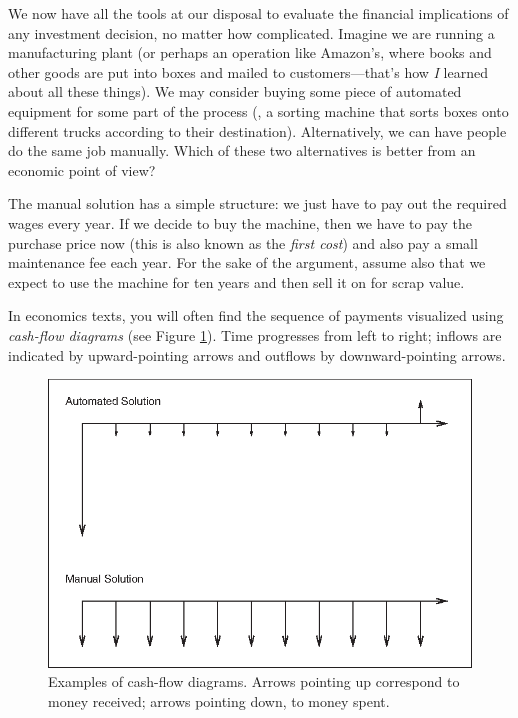 We now have all the tools at our disposal to evaluate the financial
implications of any investment decision, no matter how complicated.
Imagine we are running a manufacturing plant (or perhaps an operation
like Amazon's, where books and other goods are put into boxes and
mailed to customers---that's how \emph{I} learned about all these
things). We may consider buying some piece of automated equipment for
some part of the process (\eg, a sorting machine that sorts boxes onto
different trucks according to their destination).  Alternatively, we
can have people do the same job manually.  Which of these two
alternatives is better from an economic point of view?
    
The manual solution has a simple structure: we just have to pay out
the required wages every year. If we decide to buy the machine, then
we have to pay the purchase price now (this is also known as the
\emph{first cost}) and also pay a small maintenance fee each year. For
the sake of the argument, assume also that we expect to use the
machine for ten years and then sell it on for scrap value.
    
In economics texts, you will often find the sequence of payments
visualized using \emph{cash-flow diagrams} (see Figure
\ref{fig:cashflow}). Time progresses from left to right; inflows are
indicated by upward-pointing arrows and outflows by downward-pointing
arrows.


\begin{figure}
  \centerline{\includegraphics{img/cashflow}}
  \caption{Examples of cash-flow diagrams. Arrows pointing up
    correspond to money received; arrows pointing down, to money
    spent.}
  \label{fig:cashflow}
\end{figure}
    
